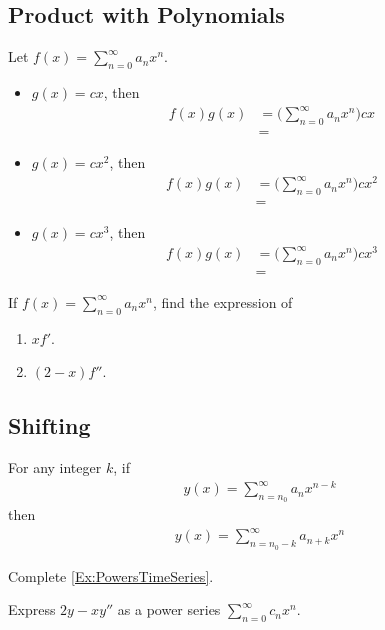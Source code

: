 \documentclass[12pt,a4paper]{article}
\newcounter{example}[section]
\begin{document}
\subsection{Product with Polynomials}
Let $f(x) = \sum_{n = 0}^\infty a_n x^n$. 
	\begin{itemize}
	\item $g(x) = cx$, then
		\begin{align*}
		f(x) g(x) &= \Big( \sum_{n = 0}^\infty a_n x^n \Big) cx \\
		&= 
		\end{align*}
	\item $g(x) = cx^2$, then
		\begin{align*}
		f(x) g(x) &= \Big( \sum_{n = 0}^\infty a_n x^n \Big) c x^2 \\
		& = 
		\end{align*}
	\item $g(x) = cx^3$, then
		\begin{align*}
		f(x) g(x) &= \Big( \sum_{n = 0}^\infty a_n x^n \Big) cx^3 \\
		&= 
		\end{align*}
	\end{itemize}

\begin{example}\label{Ex:PowersTimeSeries}
If $f(x) = \sum_{n = 0}^\infty a_n x^n$, find the expression of
	\begin{enumerate}[label=(\alph*)]
	\item $x f'$.
	\item $(2 - x) f''$.
	\end{enumerate}
\end{example}

\newpage

\phantom{2}

\newpage

\subsection{Shifting}

For any integer $k$, if
	\begin{align*}
	y(x) = \sum_{n = n_0}^\infty a_n x^{n-k}
	\end{align*}
then
	\begin{align*}
	y(x) = \sum_{n = n_0 - k}^\infty a_{n + k} x^{n}
	\end{align*}
	
\vspace*{16pt}

\begin{example}
Complete \cref{Ex:PowersTimeSeries}.
\end{example}

\newpage

\begin{example}
Express $2 y - xy''$ as a power series $\sum_{n =0}^\infty c_n x^n$.
\end{example}

\newpage

\phantom{2}
\end{document}

